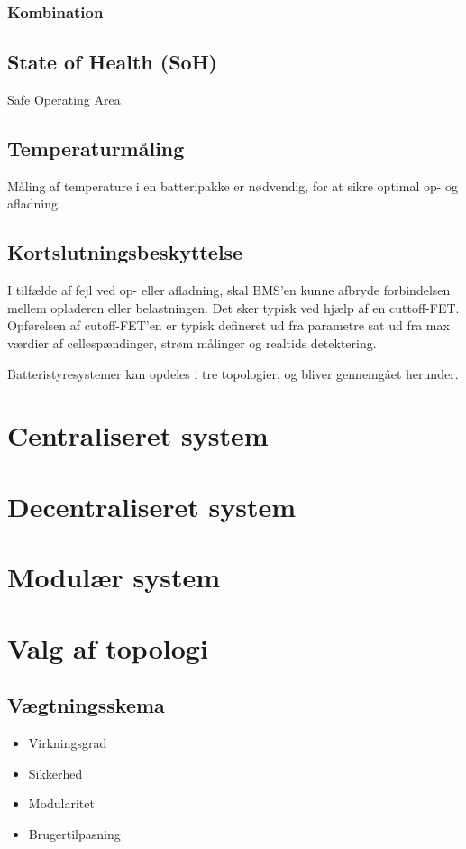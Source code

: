 \subsubsection{Kombination}


\subsection{State of Health (SoH)}
Safe Operating Area

\subsection{Temperaturmåling}
Måling af temperature i en batteripakke er nødvendig, for at sikre optimal op- og afladning. 

\subsection{Kortslutningsbeskyttelse}
I tilfælde af fejl ved op- eller afladning, skal BMS'en kunne afbryde forbindelsen mellem opladeren eller belastningen. Det sker typisk ved hjælp af en cuttoff-FET. Opførelsen af cutoff-FET'en er typisk defineret ud fra parametre sat ud fra max værdier af cellespændinger, strøm målinger og realtids detektering. 

Batteristyresystemer kan opdeles i tre topologier, og bliver gennemgået herunder.
\section{Centraliseret system}

\section{Decentraliseret system}

\section{Modulær system}

\section{Valg af topologi}

\subsection{Vægtningsskema}

\begin{itemize}
	\item Virkningsgrad
	\item Sikkerhed
	\item Modularitet
	\item Brugertilpasning
\end{itemize}